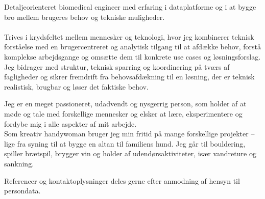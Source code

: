 \documentclass[11pt,a4paper]{article}
\begin{document}



Detaljeorienteret biomedical engineer med erfaring i dataplatforme og i at bygge bro mellem brugeres behov og tekniske muligheder.
\\\\
Trives i krydsfeltet mellem mennesker og teknologi, hvor jeg kombinerer teknisk forståelse med en brugercentreret og analytisk tilgang til at afdække behov, forstå komplekse arbejdsgange og omsætte dem til konkrete use cases og løsningsforslag. 
\\
Jeg bidrager med struktur, teknisk sparring og koordinering på tværs af fagligheder og sikrer fremdrift fra behovsafdækning til en løsning, der er teknisk realistisk, brugbar og løser det faktiske behov.












Jeg er en meget passioneret, udadvendt og nysgerrig person, som  holder af at møde og tale med forskellige mennesker og elsker at lære, eksperimentere og fordybe mig i alle aspekter af mit arbejde. 
\\
Som kreativ handywoman bruger jeg min fritid på mange forskellige projekter – lige fra syning til at bygge en altan til familiens hund. 
Jeg går til bouldering, spiller brætspil, brygger vin og holder af udendørsaktiviteter, især vandreture og sankning.

Referencer og kontaktoplysninger deles gerne efter anmodning af hensyn til persondata. \\
\end{document}
